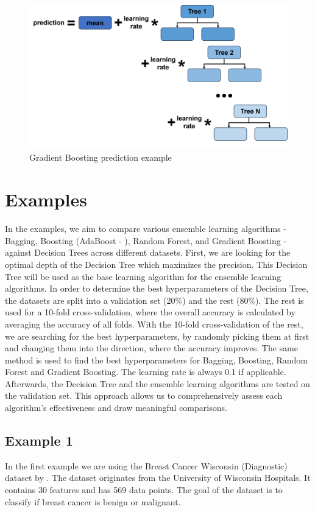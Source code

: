 \begin{figure}[htbp]
    \centering
    \includegraphics[width=.5\textwidth]{figures/gradient_boosting_prediction}
    \caption{Gradient Boosting prediction example}
\end{figure}



\section{Examples}
In the examples, we aim to compare various ensemble learning algorithms - Bagging, 
Boosting (AdaBoost - \citet{freund1996experiments}), Random Forest, and Gradient 
Boosting - against Decision Trees across different datasets.
First, we are looking for the optimal depth of the Decision Tree which maximizes the 
precision. This Decision Tree will be used as the base learning algorithm for 
the ensemble learning algorithms.
In order to determine the best hyperparameters of the Decision Tree, the datasets are 
split into a validation set (20\%) and the rest (80\%). The rest is used for a 10-fold 
cross-validation, where the overall accuracy is calculated by averaging the accuracy
of all folds. With the 10-fold cross-validation of the rest, we are searching for the
best hyperparameters, by randomly picking them at first and changing them into the
direction, where the accuracy improves.
The same method is used to find the best hyperparameters for Bagging, Boosting, 
Random Forest and Gradient Boosting. The learning rate is always 0.1 if 
applicable. Afterwards, the Decision Tree and the ensemble learning algorithms are
tested on the validation set.
This approach allows us to comprehensively assess each algorithm's effectiveness
and draw meaningful comparisons.


\subsection{Example 1}
In the first example we are using the Breast Cancer Wisconsin (Diagnostic)
dataset by \citet*{breast_cancer_wisconsin}. The dataset originates from
the University of Wisconsin Hospitals. It contains 30 features and has 569
data points. The goal of the dataset is to classify if breast cancer
is benign or malignant.

